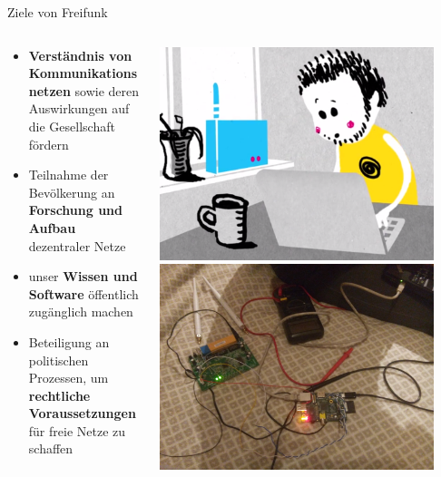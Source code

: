 \documentclass[10pt]{beamer}
\begin{document}
    \begin{frame}{Ziele von Freifunk}
      \begin{columns}[T]
        \begin{column}{5cm}
          \begin{itemize}
            \item \textbf{Verständnis von Kommunikationsnetzen} sowie deren Auswirkungen auf die Gesellschaft fördern
            \item Teilnahme der Bevölkerung an \textbf{Forschung und Aufbau} dezentraler Netze
            \item unser \textbf{Wissen und Software} öffentlich zugänglich machen
            \item Beteiligung an politischen Prozessen, um \textbf{rechtliche Voraussetzungen} für freie Netze zu schaffen
          \end{itemize}
        \end{column}
        \begin{column}{5cm}
          \includegraphics[width=0.9\textwidth]{images/install}
          \vspace{0.5em}
          \includegraphics[width=0.9\textwidth]{images/disassemble}
        \end{column}
      \end{columns}
    \end{frame}
\end{document}
